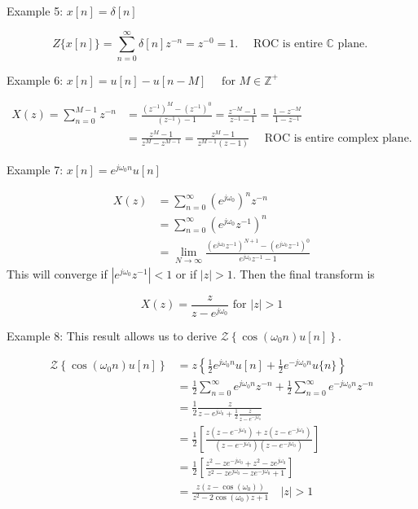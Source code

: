 \documentclass{article}
\begin{document}
Example 5: $x[n]=\delta[n]$

$$
Z\{x[n]\}=\sum_{n=0}^{\infty} \delta[n] z^{-n}=z^{-0}=1 . \quad \text { ROC is entire } \mathbb{C} \text { plane. }
$$


Example 6: $x[n]=u[n]-u[n-M] \quad\text{ for } M \in \mathbb{Z}^{+}$

$$
\begin{aligned}
X(z)=\sum_{n=0}^{M-1} z^{-n} & =\frac{\left(z^{-1}\right)^{M}-\left(z^{-1}\right)^{0}}{\left(z^{-1}\right)-1}=\frac{z^{-M}-1}{z^{-1}-1}=\frac{1-z^{-M}}{1-z^{-1}} \\
& =\frac{z^{M}-1}{z^{M}-z^{M-1}}=\frac{z^{M}-1}{z^{M-1}(z-1)} \quad \text { ROC is entire complex plane.}
\end{aligned}
$$

Example 7: $x[n]=e^{j \omega_0 n} u[n]$

$$
\begin{aligned}
  X(z) & =\sum_{n=0}^{\infty}\left(e^{j \omega_0}\right)^{n} z^{-n}\\
  &= \sum_{n=0}^{\infty}\left(e^{j \omega_0} z^{-1}\right)^{n} \\
  & =\lim _{N \rightarrow \infty} \frac{\left(e^{j \omega_0} z^{-1}\right)^{N+1}-\left(e^{j \omega_0} z^{-1}\right)^{0}}{e^{j \omega_0} z^{-1}-1}
\end{aligned}
$$
This will converge if $|e^{j\omega_0} z^{-1}| < 1$ or if $|z| > 1$. Then the final transform is

$$
X(z) = \frac{z}{z-e^{j\omega_0}} \text{ for } |z| > 1
$$

Example 8: This result allows us to derive $\mathcal{Z}\left\{\cos(\omega_0 n)u[n]\right\}$.

$$
\begin{aligned}
\mathcal{Z}\left\{\cos \left(\omega_0 n\right) u[n]\right\} &=z\left\{\frac{1}{2} e^{j \omega_0 n} u[n]+\frac{1}{2} e^{-j \omega_0 n} u\{n\}\right\} \\
& =\frac{1}{2} \sum_{n=0}^{\infty} e^{j \omega_0 n} z^{-n}+\frac{1}{2} \sum_{n=0}^{\infty} e^{-j \omega_0 n} z^{-n} \\
& =\frac{1}{2} \frac{z}{z-e^{j \omega_0}+\frac{1}{2} \frac{z}{z-e^{-j \omega_0}}} \\
& =\frac{1}{2}\left[\frac{z\left(z-e^{-j \omega_0}\right)+z\left(z-e^{-j \omega_0}\right)}{\left(z-e^{-j \omega_0}\right)\left(z-e^{-j \omega_0}\right)}\right] \\
& =\frac{1}{2}\left[\frac{z^{2}-z e^{-j \omega_0}+z^{2}-z e^{j \omega_0}}{z^{2}-z e^{j \omega_0}-z e^{-j \omega_0}+1}\right] \\
& =\frac{z\left(z-\cos \left(\omega_0\right)\right)}{z^{2}-2 \cos \left(\omega_0\right) z+1} \quad|z|>1
\end{aligned}
$$
\end{document}
